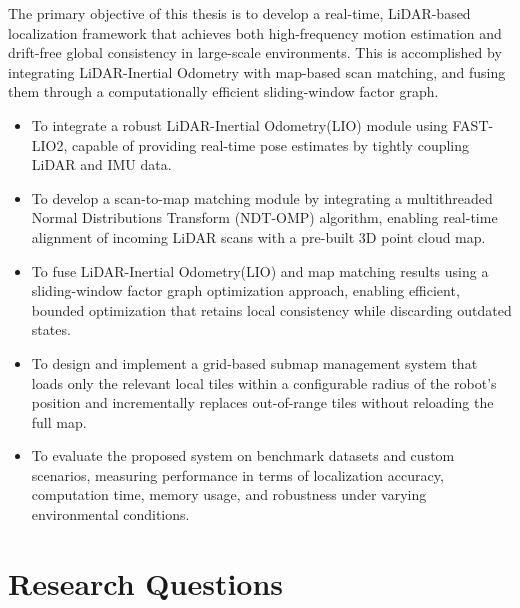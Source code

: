 The primary objective of this thesis is to develop a real-time, LiDAR-based localization framework that achieves both high-frequency motion estimation and drift-free global consistency in large-scale environments. This is accomplished by integrating LiDAR-Inertial Odometry with map-based scan matching, and fusing them through a computationally efficient sliding-window factor graph.
\begin{itemize}
	\item To integrate a robust LiDAR-Inertial Odometry(LIO) module using FAST-LIO2, capable of providing real-time pose estimates by tightly coupling LiDAR and IMU data.
	\item To develop a scan-to-map matching module by integrating a multithreaded Normal Distributions Transform (NDT-OMP) algorithm, enabling real-time alignment of incoming LiDAR scans with a pre-built 3D point cloud map.
	\item To fuse LiDAR-Inertial Odometry(LIO) and map matching results using a sliding-window factor graph optimization approach, enabling efficient, bounded optimization that retains local consistency while discarding outdated states.
	\item To design and implement a grid-based submap management system that loads only the relevant local tiles within a configurable radius of the robot’s position and incrementally replaces out-of-range tiles without reloading the full map.
	\item To evaluate the proposed system on benchmark datasets and custom scenarios, measuring performance in terms of localization accuracy, computation time, memory usage, and robustness under varying environmental conditions.
\end{itemize}
\section{Research Questions}

